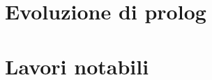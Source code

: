 \section{Evoluzione di prolog}
\label{sec:evoluzione}
\section{Lavori notabili}
\label{sec:lavori}



